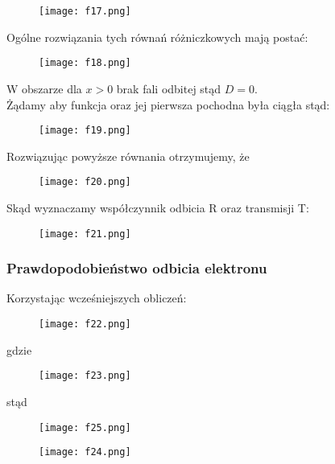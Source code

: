 \documentclass[a4paper,15pt]{article}
\begin{document}
\begin{figure}[H]
\centerline{\texttt{[image: f17.png]}}
\end{figure}

\newpage
Ogólne rozwiązania tych równań różniczkowych mają postać:

\begin{figure}[H]
\centerline{\texttt{[image: f18.png]}}
\end{figure}

W obszarze dla $x>0$ brak fali odbitej stąd $D=0$. \\

Żądamy aby funkcja oraz jej pierwsza pochodna była ciągła stąd:

\begin{figure}[H]
\centerline{\texttt{[image: f19.png]}}
\end{figure}

Rozwiązując powyższe równania otrzymujemy, że 

\begin{figure}[H]
\centerline{\texttt{[image: f20.png]}}
\end{figure}

Skąd wyznaczamy współczynnik odbicia R oraz transmisji T:

\begin{figure}[H]
\centerline{\texttt{[image: f21.png]}}
\end{figure}

\newpage
\subsubsection{Prawdopodobieństwo odbicia elektronu}

Korzystając wcześniejszych obliczeń:

\begin{figure}[H]
\centerline{\texttt{[image: f22.png]}}
\end{figure}

gdzie

\begin{figure}[H]
\centerline{\texttt{[image: f23.png]}}
\end{figure}

stąd

\begin{figure}[H]
\centerline{\texttt{[image: f25.png]}}
\end{figure}


\begin{figure}[H]
\centerline{\texttt{[image: f24.png]}}
\end{figure}
\end{document}

